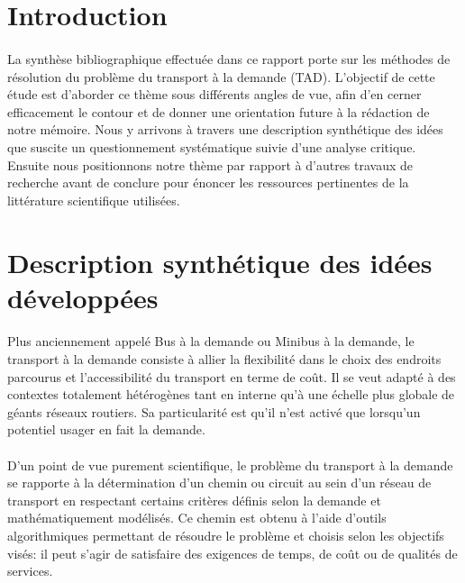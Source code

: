 \documentclass{article}
\begin{document}
\section{Introduction}

\paragraph{}
La synthèse bibliographique effectuée dans ce rapport porte sur les méthodes de résolution du problème du transport à la demande (TAD). L'objectif de cette étude est d'aborder ce thème sous différents angles de vue, afin d'en cerner efficacement le contour et de donner une orientation future à la rédaction de notre mémoire. Nous y arrivons à travers une description synthétique des idées que suscite un questionnement systématique suivie d'une analyse critique. Ensuite nous positionnons notre thème par rapport à d'autres travaux de recherche avant de conclure pour énoncer les ressources pertinentes de la littérature scientifique utilisées.


\section{Description synthétique des idées développées}

\paragraph{}
Plus anciennement appelé Bus à la demande ou Minibus à la demande, le transport à la demande consiste à allier la flexibilité dans le choix des endroits parcourus et l’accessibilité du transport en terme de coût. Il se veut adapté à des contextes totalement hétérogènes tant en interne qu’à une échelle plus globale de géants réseaux routiers. Sa particularité est qu’il n’est activé que lorsqu’un potentiel usager en fait la demande.

\paragraph{}
D'un point de vue purement scientifique, le problème du transport à la demande se rapporte à la détermination d'un chemin ou circuit au sein d'un réseau de transport en respectant certains critères définis selon la demande et mathématiquement modélisés. Ce chemin est obtenu à l'aide d'outils algorithmiques permettant de résoudre le problème et choisis selon les objectifs visés: il peut s'agir de satisfaire des exigences de temps, de coût ou de qualités de services.
\end{document}
